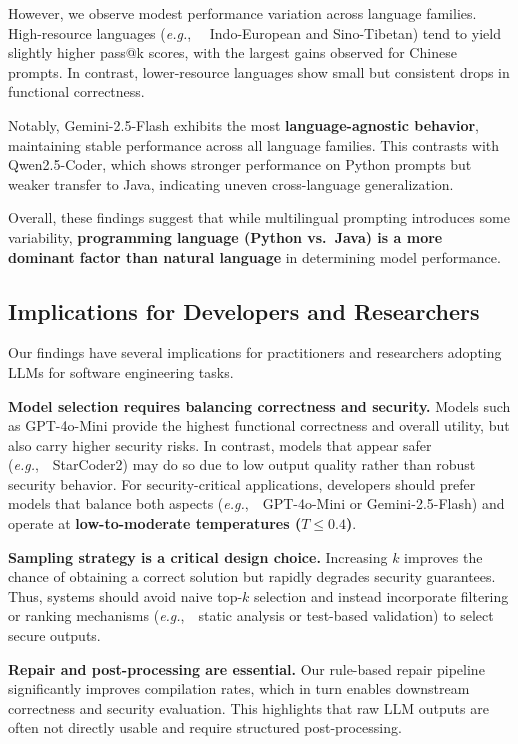 \documentclass[pdflatex,sn-mathphys-ay]{sn-jnl}
\newcommand{\eg}{\textit{e.g.},\ }
\begin{document}
However, we observe modest performance variation across language families. High-resource languages (\eg~ Indo-European and Sino-Tibetan) tend to yield slightly higher pass@k scores, with the largest gains observed for Chinese prompts. In contrast, lower-resource languages show small but consistent drops in functional correctness. 

Notably, Gemini-2.5-Flash exhibits the most \textbf{language-agnostic behavior}, maintaining stable performance across all language families. This contrasts with Qwen2.5-Coder, which shows stronger performance on Python prompts but weaker transfer to Java, indicating uneven cross-language generalization.

Overall, these findings suggest that while multilingual prompting introduces some variability, \textbf{programming language (Python vs.\ Java) is a more dominant factor than natural language} in determining model performance.

\subsection{Implications for Developers and Researchers}
Our findings have several implications for practitioners and researchers adopting LLMs for software engineering tasks.

\textbf{Model selection requires balancing correctness and security.}
Models such as GPT-4o-Mini provide the highest functional correctness and overall utility, but also carry higher security risks. In contrast, models that appear safer (\eg~StarCoder2) may do so due to low output quality rather than robust security behavior. For security-critical applications, developers should prefer models that balance both aspects (\eg~GPT-4o-Mini or Gemini-2.5-Flash) and operate at \textbf{low-to-moderate temperatures ($T \leq 0.4$)}.

\textbf{Sampling strategy is a critical design choice.}
Increasing $k$ improves the chance of obtaining a correct solution but rapidly degrades security guarantees. Thus, systems should avoid naive top-$k$ selection and instead incorporate filtering or ranking mechanisms (\eg~static analysis or test-based validation) to select secure outputs.

\textbf{Repair and post-processing are essential.}
Our rule-based repair pipeline significantly improves compilation rates, which in turn enables downstream correctness and security evaluation. This highlights that raw LLM outputs are often not directly usable and require structured post-processing.
\end{document}
